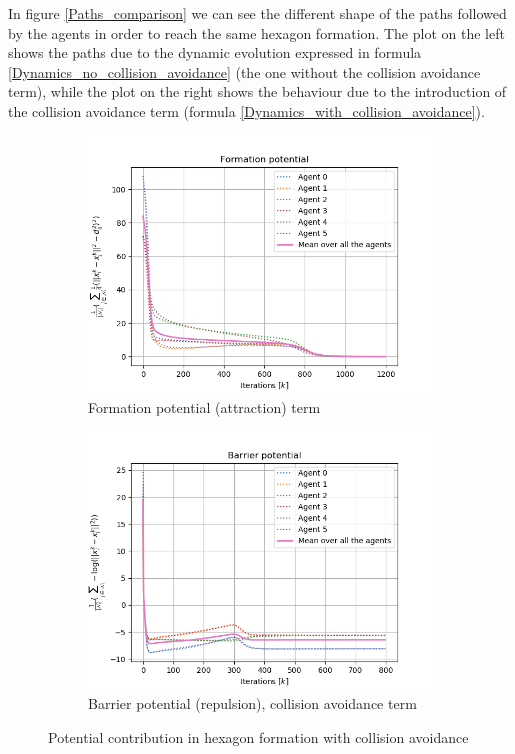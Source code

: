 \documentclass[a4paper,11pt,oneside]{book}
\begin{document}
In figure \ref{Paths_comparison} we can see the different shape of the paths followed by the agents in order to reach the same hexagon formation. The plot on the left shows the paths due to the dynamic evolution expressed in formula \ref{Dynamics_no_collision_avoidance} (the one without the collision avoidance term), while the plot on the right shows the behaviour due to the introduction of the collision avoidance term (formula \ref{Dynamics_with_collision_avoidance}).

\begin{figure}[h]
\centering
	\begin{subfigure}{0.49\textwidth}	
	\includegraphics[scale=0.42]{Task-2.2_Formation-p_Yes-Coll-Avoid_Hexagon}
	\caption{Formation potential (attraction) term}
	\end{subfigure}
\hfill
	\begin{subfigure}{0.49\textwidth}	
	\includegraphics[scale=0.42]{Barrier_potential_hexagon_collision.png}
	\caption{Barrier potential (repulsion), collision avoidance term}
	\end{subfigure}
\caption{Potential contribution in hexagon formation with collision avoidance}
\label{Potentials_with_collision}
\end{figure}
\end{document}
